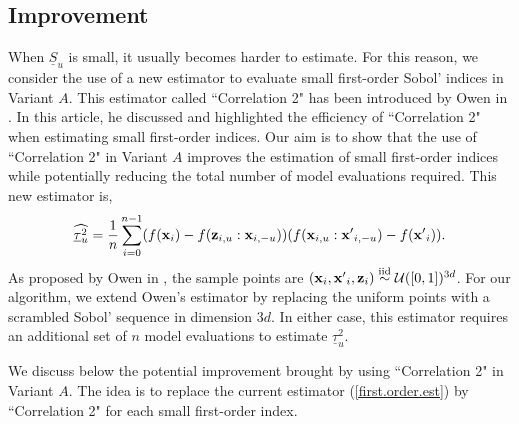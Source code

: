 \subsection{Improvement}
\label{sec:4.2}

When $\underline{S}_u$ is small, it usually becomes harder to estimate. For this reason, we consider the use of a new estimator to evaluate small first-order Sobol' indices in Variant $A$. This estimator called ``Correlation 2" has been introduced by Owen in \cite{Owen}. In this article, he discussed and highlighted the efficiency of ``Correlation 2" when estimating small first-order indices. Our aim is to show that the use of ``Correlation 2" in Variant $A$ improves the estimation of small first-order indices while potentially reducing the total number of model evaluations required. This new estimator is,
\begin{equation*}
\widehat{\underline{\tau}_u^2} = \frac{1}{n} \sum \limits_{i=0}^{n-1} (f(\boldsymbol{\mathbf{x}}_i)-f({\boldsymbol{\mathbf{z}}}_{i,u}:{\boldsymbol{\mathbf{x}}}_{i,-u}))(f(\boldsymbol{\mathbf{x}}_{i,u}:{\boldsymbol{\mathbf{x}}'}_{i,-u})-f({\boldsymbol{\mathbf{x}}'}_i)).
\end{equation*}
As proposed by Owen in \cite{Owen}, the sample points are \break $(\boldsymbol{\mathbf{x}}_i,{\boldsymbol{\mathbf{x}}'}_i, \boldsymbol{\mathbf{z}}_i) \stackrel{{\rm iid}}{\sim} \mathcal{U}([0,1])^{3d}$. For our algorithm, we extend \break Owen's estimator by replacing the uniform points with a scrambled Sobol' sequence in dimension $3d$. In either case, this estimator requires an additional set of $n$ model evaluations to estimate $\underline{\tau}_u^2$.
\bigskip

We discuss below the potential improvement brought by using ``Correlation 2" in Variant $A$. The idea is to replace the current estimator (\ref{first.order.est}) by  ``Correlation 2" for each small first-order index. 

